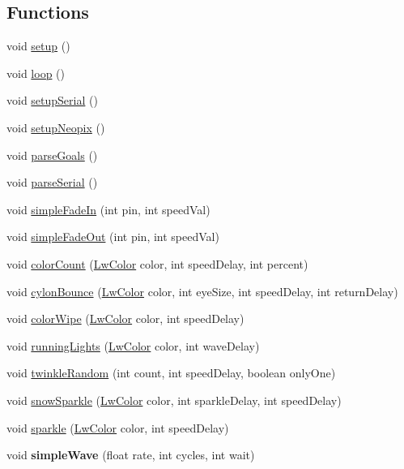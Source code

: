 \subsection*{Functions}
\begin{DoxyCompactItemize}
\item 
void \hyperlink{ledCryptoTree_8ino_a4fc01d736fe50cf5b977f755b675f11d}{setup} ()
\item 
void \hyperlink{ledCryptoTree_8ino_afe461d27b9c48d5921c00d521181f12f}{loop} ()
\item 
void \hyperlink{ledCryptoTree_8ino_ad4e0c88560cf11558cafaded5334a413}{setup\+Serial} ()
\item 
void \hyperlink{ledCryptoTree_8ino_a3d4a7770febd94a46810f36c3d2ac32e}{setup\+Neopix} ()
\item 
void \hyperlink{ledCryptoTree_8ino_a9e090d395c12709aa3a4ff2754b30828}{parse\+Goals} ()
\item 
void \hyperlink{ledCryptoTree_8ino_a2fb2eb2b13bc6122f9c89d000e2d7d01}{parse\+Serial} ()
\item 
void \hyperlink{ledCryptoTree_8ino_ad5820c78928d904adcd4f284142c506b}{simple\+Fade\+In} (int pin, int speed\+Val)
\item 
void \hyperlink{ledCryptoTree_8ino_a10a605d30a8a525a684e774fba0504d9}{simple\+Fade\+Out} (int pin, int speed\+Val)
\item 
void \hyperlink{ledCryptoTree_8ino_aac3dce34012696fd5c98eb88847e61cd}{color\+Count} (\hyperlink{structLwColor}{Lw\+Color} color, int speed\+Delay, int percent)
\item 
void \hyperlink{ledCryptoTree_8ino_af32fca95526cc1e6753e75cbc621a10a}{cylon\+Bounce} (\hyperlink{structLwColor}{Lw\+Color} color, int eye\+Size, int speed\+Delay, int return\+Delay)
\item 
void \hyperlink{ledCryptoTree_8ino_a96de8ed535af4104229f69adbb6da86c}{color\+Wipe} (\hyperlink{structLwColor}{Lw\+Color} color, int speed\+Delay)
\item 
void \hyperlink{ledCryptoTree_8ino_a68f58d95cb1f5743c670bb22f248fed1}{running\+Lights} (\hyperlink{structLwColor}{Lw\+Color} color, int wave\+Delay)
\item 
void \hyperlink{ledCryptoTree_8ino_ad89dd890beff1d9b79fa3574d096cf7d}{twinkle\+Random} (int count, int speed\+Delay, boolean only\+One)
\item 
void \hyperlink{ledCryptoTree_8ino_ae0c03f03209028b418a16bd771a6f4c0}{snow\+Sparkle} (\hyperlink{structLwColor}{Lw\+Color} color, int sparkle\+Delay, int speed\+Delay)
\item 
void \hyperlink{ledCryptoTree_8ino_a907e4fe4e66cedec66df790c3acbbad7}{sparkle} (\hyperlink{structLwColor}{Lw\+Color} color, int speed\+Delay)
\item 
\hypertarget{ledCryptoTree_8ino_a717066609dbbcc3f6c56fd346e349dae}{void {\bfseries simple\+Wave} (float rate, int cycles, int wait)}\label{ledCryptoTree_8ino_a717066609dbbcc3f6c56fd346e349dae}


\end{DoxyCompactItemize}
